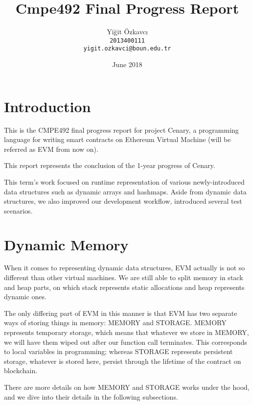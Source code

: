 \documentclass{article}
\title{Cmpe492 Final Progress Report}
\author{
  Yiğit Özkavcı \\
  \texttt{2013400111} \\
  \texttt{yigit.ozkavci@boun.edu.tr}
}
\date{June 2018}
\begin{document}

\maketitle

\tableofcontents

\newpage

\section{Introduction}
\par 
\par This is the CMPE492 final progress report for project Cenary, a programming language for writing smart contracts on Ethereum Virtual Machine (will be referred as EVM from now on).
\par This report represents the conclusion of the 1-year progress of Cenary.

\par This term's work focused on runtime representation of various newly-introduced data structures such as dynamic arrays and hashmaps. Aside from dynamic data structures, we also improved our development workflow, introduced several test scenarios.

\section{Dynamic Memory}
When it comes to representing dynamic data structures, EVM actually is not so different than other virtual machines. We are still able to split memory in stack and heap parts, on which stack represents static allocations and heap represents dynamic ones.
\par The only differing part of EVM in this manner is that EVM has two separate ways of storing things in memory: MEMORY and STORAGE. MEMORY represents temporary storage, which means that whatever we store in MEMORY, we will have them wiped out after our function call terminates. This corresponds to local variables in programming; whereas STORAGE represents persistent storage, whatever is stored here, persist through the lifetime of the contract on blockchain.
\par There are more details on how MEMORY and STORAGE works under the hood, and we dive into their details in the following subsections.
\end{document}
